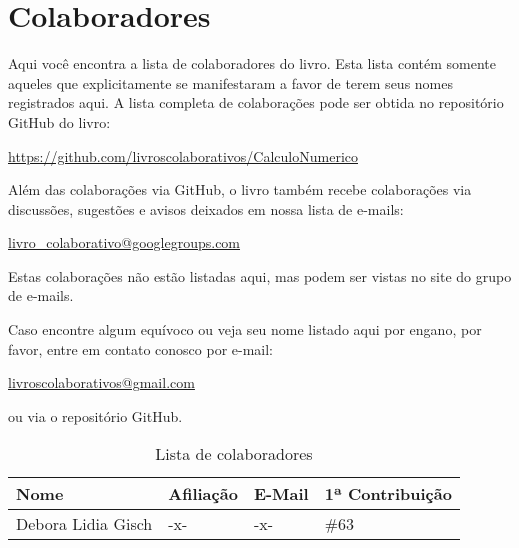 
%
%
%

\chapter*{Colaboradores}
\fancyhead[LE,RO]{\thepage}

Aqui você encontra a lista de colaboradores do livro. Esta lista contém somente aqueles que explicitamente se manifestaram a favor de terem seus nomes registrados aqui. A lista completa de colaborações pode ser obtida no repositório GitHub do livro:
\begin{center}
  \url{https://github.com/livroscolaborativos/CalculoNumerico}
\end{center}
Além das colaborações via GitHub, o livro também recebe colaborações via discussões, sugestões e avisos deixados em nossa lista de e-mails:
\begin{center}
\url{livro_colaborativo@googlegroups.com}
\end{center}
Estas colaborações não estão listadas aqui, mas podem ser vistas no site do grupo de e-mails.

Caso encontre algum equívoco ou veja seu nome listado aqui por engano, por favor, entre em contato conosco por e-mail:
\begin{center}
  \url{livroscolaborativos@gmail.com}
\end{center}
ou via o repositório GitHub.

\begin{table}[h!]
  \centering
  \caption{Lista de colaboradores}
  \label{tab:colaboradores}
  \begin{tabular}{llll} \hline
    Nome & Afiliação & E-Mail & 1ª Contribuição\\ \hline
    Debora Lidia Gisch & -x- & -x- & \#63 \\
    \hline
  \end{tabular}
\end{table}
